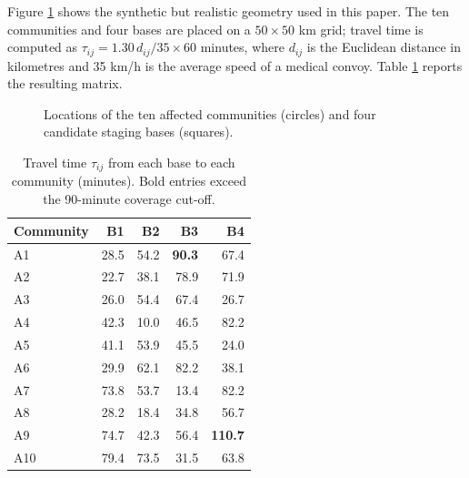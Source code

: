 \documentclass{apmcmthesis}
\begin{document}
Figure \ref{fig:map} shows the synthetic but realistic geometry used in this paper. The ten communities and four bases are placed on a $50\times50$ km grid; travel time is computed as $\tau_{ij}=1.30\,d_{ij}/35\times60$ minutes, where $d_{ij}$ is the Euclidean distance in kilometres and 35 km/h is the average speed of a medical convoy. Table \ref{tab:travel} reports the resulting matrix.

\begin{figure}[!ht]
\centering
{}
\caption{Locations of the ten affected communities (circles) and four candidate staging bases (squares).}
\label{fig:map}
\end{figure}

\begin{table}[!ht]
\centering
\caption{Travel time $\tau_{ij}$ from each base to each community (minutes). Bold entries exceed the 90-minute coverage cut-off.}
\label{tab:travel}
\small
\begin{tabular}{lrrrr}
\toprule
Community & B1 & B2 & B3 & B4 \\
\midrule
A1  & 28.5 & 54.2 & \textbf{90.3} & 67.4 \\
A2  & 22.7 & 38.1 & 78.9 & 71.9 \\
A3  & 26.0 & 54.4 & 67.4 & 26.7 \\
A4  & 42.3 & 10.0 & 46.5 & 82.2 \\
A5  & 41.1 & 53.9 & 45.5 & 24.0 \\
A6  & 29.9 & 62.1 & 82.2 & 38.1 \\
A7  & 73.8 & 53.7 & 13.4 & 82.2 \\
A8  & 28.2 & 18.4 & 34.8 & 56.7 \\
A9  & 74.7 & 42.3 & 56.4 & \textbf{110.7} \\
A10 & 79.4 & 73.5 & 31.5 & 63.8 \\
\bottomrule
\end{tabular}
\end{table}
\end{document}
